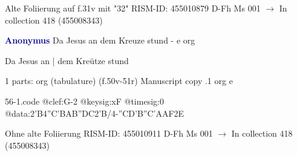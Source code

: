 \documentclass[twocolumn]{book}
\begin{document}
\newline Alte Foliierung auf f.31v mit "32"
\newline RISM-ID: 455010879
\newline D-Fh  Ms 001
\newline $\rightarrow$ In collection 418 (455008343)
      
\newline \par \vspace{7pt} \textcolor{darkblue}{\textbf{Anonymus  }}
\newline Da Jesus an dem Kreuze stund - e
\newline org
\newline \begin{itshape}[f.50v, at left:] Da Jesus an | dem Kreütze stund\end{itshape} 
\newline \textcolor{darkblue}{}  1 parts: org (tabulature)  (f.50v-51r)
\newline Manuscript copy
.1  org  e  
\begin{filecontents*}{56-1.code}
@clef:G-2
@keysig:xF
@timesig:0
@data:2'B4''C'BAB''DC2'B/4-''CD'B''C'AAF2E
\end{filecontents*}
\newline
%

\newline Ohne alte Foliierung
\newline RISM-ID: 455010911
\newline D-Fh  Ms 001
\newline $\rightarrow$ In collection 418 (455008343)
      
\end{document}
